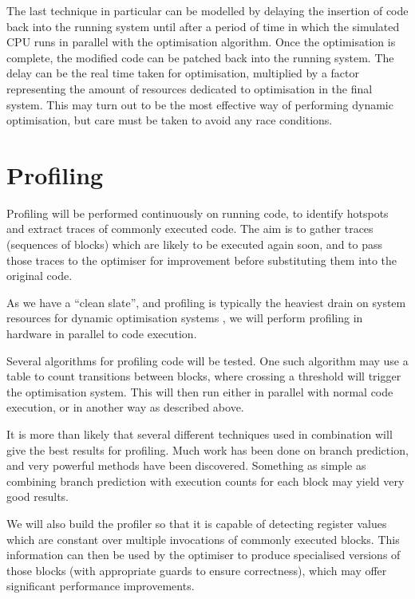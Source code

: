 \documentclass[11pt,letterpaper,twocolumn,notitlepage]{article}
\begin{document}
The last technique in particular can be modelled by delaying the insertion of code back into the running system until after a period of time in which the simulated CPU runs in parallel with the optimisation algorithm. Once the optimisation is complete, the modified code can be patched back into the running system. The delay can be the real time taken for optimisation, multiplied by a factor representing the amount of resources dedicated to optimisation in the final system. This may turn out to be the most effective way of performing dynamic optimisation, but care must be taken to avoid any race conditions.

\section{Profiling}

Profiling will be performed continuously on running code, to identify hotspots and extract traces of commonly executed code. The aim is to gather traces (sequences of blocks) which are likely to be executed again soon, and to pass those traces to the optimiser for improvement before substituting them into the original code.

As we have a ``clean slate'', and profiling is typically the heaviest drain on system resources for dynamic optimisation systems \cite{Dynamo,Mojo}, we will perform profiling in hardware in parallel to code execution.

Several algorithms for profiling code will be tested. One such algorithm may use a table to count transitions between blocks, where crossing a threshold will trigger the optimisation system. This will then run either in parallel with normal code execution, or in another way as described above.

It is more than likely that several different techniques used in combination will give the best results for profiling. Much work has been done on branch prediction, and very powerful methods have been discovered. Something as simple as combining branch prediction with execution counts for each block may yield very good results.

We will also build the profiler so that it is capable of detecting register values which are constant over multiple invocations of commonly executed blocks. This information can then be used by the optimiser to produce specialised versions of those blocks (with appropriate guards to ensure correctness), which may offer significant performance improvements.
\end{document}
